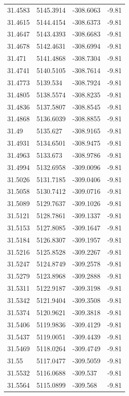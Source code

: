 \begin{table}[H]
\begin{tabular}{llll}
31.4583 & 5145.3914 & -308.6063 & -9.81 \\
31.4615 & 5144.4154 & -308.6373 & -9.81 \\
31.4647 & 5143.4393 & -308.6683 & -9.81 \\
31.4678 & 5142.4631 & -308.6994 & -9.81 \\
31.471 & 5141.4868 & -308.7304 & -9.81 \\
31.4741 & 5140.5105 & -308.7614 & -9.81 \\
31.4773 & 5139.534 & -308.7924 & -9.81 \\
31.4805 & 5138.5574 & -308.8235 & -9.81 \\
31.4836 & 5137.5807 & -308.8545 & -9.81 \\
31.4868 & 5136.6039 & -308.8855 & -9.81 \\
31.49 & 5135.627 & -308.9165 & -9.81 \\
31.4931 & 5134.6501 & -308.9475 & -9.81 \\
31.4963 & 5133.673 & -308.9786 & -9.81 \\
31.4994 & 5132.6958 & -309.0096 & -9.81 \\
31.5026 & 5131.7185 & -309.0406 & -9.81 \\
31.5058 & 5130.7412 & -309.0716 & -9.81 \\
31.5089 & 5129.7637 & -309.1026 & -9.81 \\
31.5121 & 5128.7861 & -309.1337 & -9.81 \\
31.5153 & 5127.8085 & -309.1647 & -9.81 \\
31.5184 & 5126.8307 & -309.1957 & -9.81 \\
31.5216 & 5125.8528 & -309.2267 & -9.81 \\
31.5247 & 5124.8749 & -309.2578 & -9.81 \\
31.5279 & 5123.8968 & -309.2888 & -9.81 \\
31.5311 & 5122.9187 & -309.3198 & -9.81 \\
31.5342 & 5121.9404 & -309.3508 & -9.81 \\
31.5374 & 5120.9621 & -309.3818 & -9.81 \\
31.5406 & 5119.9836 & -309.4129 & -9.81 \\
31.5437 & 5119.0051 & -309.4439 & -9.81 \\
31.5469 & 5118.0264 & -309.4749 & -9.81 \\
31.55 & 5117.0477 & -309.5059 & -9.81 \\
31.5532 & 5116.0688 & -309.537 & -9.81 \\
31.5564 & 5115.0899 & -309.568 & -9.81 \\

\end{tabular}
\end{table}
